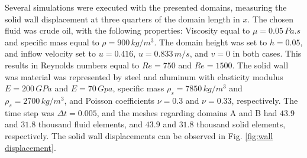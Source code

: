 \documentclass{article}
\begin{document}
Several simulations were executed with the presented domains, measuring the solid wall displacement at three quarters of the domain length in $x$. The chosen fluid was crude oil, with the following properties: Viscosity equal to $\mu=0.05\,Pa.s$ and specific mass equal to $\rho = 900\,kg/m^3$. The domain height was set to $h=0.05$, and inflow velocity set to $u=0.416$, $u=0.833 \, m/s$, and $v = 0$ in both cases. This results in Reynolds numbers equal to $Re=750$ and $Re=1500$. The solid wall was material was represented by steel and aluminum with elasticity modulus $E=200 \, GPa$ and $E=70 \, Gpa$, specific mass $\rho_s = 7850 \, kg/m^3$ and $\rho_s = 2700 \, kg/m^3$, and Poisson coefficients $\nu = 0.3$ and $\nu = 0.33$, respectively. The time step was $\Delta t = 0.005$, and the meshes regarding domains A and B had $43.9$ and $31.8$ thousand fluid elements, and $43.9$ and $31.8$ thousand solid elements, respectively. The solid wall displacements can be observed in Fig. \ref{fig:wall displacement}.
\end{document}
